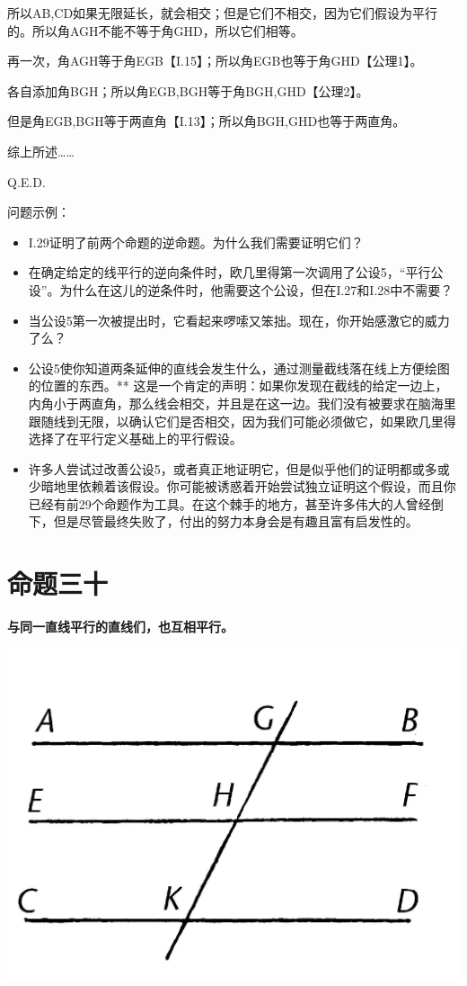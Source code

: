\documentclass[
]{book}
\providecommand{\tightlist}{%
  \setlength{\itemsep}{0pt}\setlength{\parskip}{0pt}}
\begin{document}
所以AB,CD如果无限延长，就会相交；但是它们不相交，因为它们假设为平行的。所以角AGH不能不等于角GHD，所以它们相等。

再一次，角AGH等于角EGB【I.15】；所以角EGB也等于角GHD【公理1】。

各自添加角BGH；所以角EGB,BGH等于角BGH,GHD【公理2】。

但是角EGB,BGH等于两直角【I.13】；所以角BGH,GHD也等于两直角。

综上所述\ldots\ldots{}

Q.E.D.

问题示例：

\begin{itemize}
\tightlist
\item
  I.29证明了前两个命题的逆命题。为什么我们需要证明它们？
\item
  在确定给定的线平行的逆向条件时，欧几里得第一次调用了公设5，``平行公设''。为什么在这儿的逆条件时，他需要这个公设，但在I.27和I.28中不需要？
\item
  当公设5第一次被提出时，它看起来啰嗦又笨拙。现在，你开始感激它的威力了么？
\item
  公设5使你知道两条延伸的直线会发生什么，通过测量截线落在线上方便绘图的位置的东西。** 这是一个肯定的声明：如果你发现在截线的给定一边上，内角小于两直角，那么线会相交，并且是在这一边。我们没有被要求在脑海里跟随线到无限，以确认它们是否相交，因为我们可能必须做它，如果欧几里得选择了在平行定义基础上的平行假设。
\item
  许多人尝试过改善公设5，或者真正地证明它，但是似乎他们的证明都或多或少暗地里依赖着该假设。你可能被诱惑着开始尝试独立证明这个假设，而且你已经有前29个命题作为工具。在这个棘手的地方，甚至许多伟大的人曾经倒下，但是尽管最终失败了，付出的努力本身会是有趣且富有启发性的。
\end{itemize}

\hypertarget{ux547dux9898ux4e09ux5341}{%
\section{命题三十}\label{ux547dux9898ux4e09ux5341}}

\textbf{与同一直线平行的直线们，也互相平行。}

\includegraphics[width=0.3\linewidth]{./image/img515}
\end{document}
